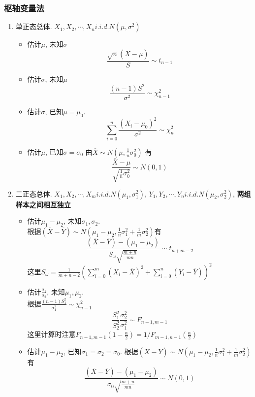 \documentclass[UTF8]{article}
\begin{document}
\subsubsection{枢轴变量法}
\begin{enumerate}
	\item 单正态总体. $X_1, X_2, \cdots, X_n i.i.d. N(\mu, \sigma^2)$
	\begin{itemize}
		\item 估计$\mu$, 未知$\sigma$
		$$\frac{\sqrt{n}(\overline{X}-\mu)}{S}\sim t_{n-1}$$
		
		\item 估计$\sigma$, 未知$\mu$
		$$\frac{(n-1)S^2}{\sigma^2}\sim \chi_{n-1}^2$$
		
		\item 估计$\sigma$, 已知$\mu=\mu_0$.\\
		$$\sum\limits_{i=0}^n\frac{(X_i-\mu_0)^2}{\sigma^2} \sim \chi_{n}^2$$
		
		\item 估计$\mu$, 已知$\sigma=\sigma_0$
		由$\overline{X}\sim N(\mu,\frac{1}{n}\sigma_0^2)$
		有$$\frac{\overline{X}-\mu}{\sqrt{\frac{1}{n}\sigma_0^2}} \sim N(0, 1)$$
					
	\end{itemize}
	
	\item 二正态总体. $X_1, X_2, \cdots, X_m i.i.d. N(\mu_1, \sigma_1^2)$, $Y_1, Y_2, \cdots, Y_n i.i.d. N(\mu_2, \sigma_2^2)$, \textbf{两组样本之间相互独立}
	\begin{itemize}
		\item 估计$\mu_1-\mu_2$, 未知$\sigma_1, \sigma_2$. \\
		根据$(\overline{X}-\overline{Y}) \sim N(\mu_1-\mu_2, \frac{1}{n}\sigma_1^2+\frac{1}{m}\sigma_2^2)$有
		$$\frac{(\overline{X}-\overline{Y})-(\mu_1-\mu_2)}{S_\omega\sqrt{\frac{m+n}{mn}}} \sim t_{n+m-2}$$
		这里$S_\omega=\frac{1}{m+n-2}(\sum\limits_{i=0}^{m}(X_i-\overline{X})^2+\sum\limits_{i=0}^{n}(Y_i-\overline{Y}))^2$
		
		\item 估计$\frac{\sigma_1}{\sigma_2}$, 未知$\mu_1, \mu_2$.\\
		根据$\frac{(n-1)S_1^2}{\sigma_1^2} \sim \chi_{n-1}^2$
		$$\frac{S_1^2}{S_2^2}\frac{\sigma_2^2}{\sigma_1^2} \sim F_{n-1, m-1}$$
		这里计算时注意$F_{n-1, m-1}(1-\frac{\alpha}{2})=1/F_{m-1, n-1}(\frac{\alpha}{2})$
		
		\item 估计$\mu_1-\mu_2$, 已知$\sigma_1=\sigma_2=\sigma_0$.
		根据$(\overline{X}-\overline{Y}) \sim N(\mu_1-\mu_2, \frac{1}{n}\sigma_1^2+\frac{1}{m}\sigma_2^2)$有
		$$\frac{(\overline{X}-\overline{Y})-(\mu_1-\mu_2)}{\sigma_0\sqrt{\frac{m+n}{mn}}} \sim N(0, 1)$$
						

\end{itemize}
\end{enumerate}
\end{document}

